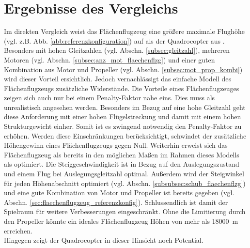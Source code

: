 \section{Ergebnisse des Vergleichs}
\label{sec:ergebnisse_vergleich} 
Im direkten Vergleich weist das Flächenflugzeug eine größere maximale Flughöhe (vgl. z.B. Abb. \ref{abb:referenzkonfiguration}) auf als der Quadrocopter aus \cite{Anderson.2018}. Besonders mit hohen Gleitzahlen (vgl. Abschn. \ref{subsec:gleitzahl}), mehreren Motoren (vgl. Abschn. \ref{subsec:anz_mot_flaechenflzg}) und einer guten Kombination aus Motor und Propeller (vgl. Abschn. \ref{subsec:mot_prop_kombi}) wird dieser Vorteil ersichtlich. Jedoch vernachlässigt das einfache Modell des Flächenflugzeugs zusätzliche Widerstände. Die Vorteile eines Flächenflugzeuges zeigen sich auch nur bei einem Penalty-Faktor nahe eins. Dies muss als unrealistisch angesehen werden. Besonders im Bezug auf eine hohe Gleitzahl geht diese Anforderung mit einer hohen Flügelstreckung und damit mit einem hohen Strukturgewicht einher. Somit ist es zwingend notwendig den Penalty-Faktor zu erhöhen. Werden diese Einschränkungen berücksichtigt, schwindet der zusätzliche Höhengewinn eines Flächenflugzeugs gegen Null. Weiterhin erweist sich das Flächenflugzeug als bereits in den möglichen Maßen im Rahmen dieses Modells als optimiert. Die Steiggeschwindigkeit ist in Bezug auf den Auslegungszustand und einem Flug bei Auslegungsgleitzahl optimal. Außerdem wird der Steigwinkel für jeden Höhenabschnitt optimiert (vgl. Abschn. \ref{subsubsec:schub_flaechenflzg}) und eine gute Kombination von Motor und Propeller ist bereits gegeben (vgl. Abschn. \ref{sec:flaechenflugzeug_referenzkonfig}). Schlussendlich ist damit der Spielraum für weitere Verbesserungen eingeschränkt. Ohne die Limitierung durch den Propeller könnte ein  ideales Flächenflugzeug Höhen von mehr als \SI{18000}{m} erreichen. \\
Hingegen zeigt der Quadrocopter in dieser Hinsicht noch Potential. %
